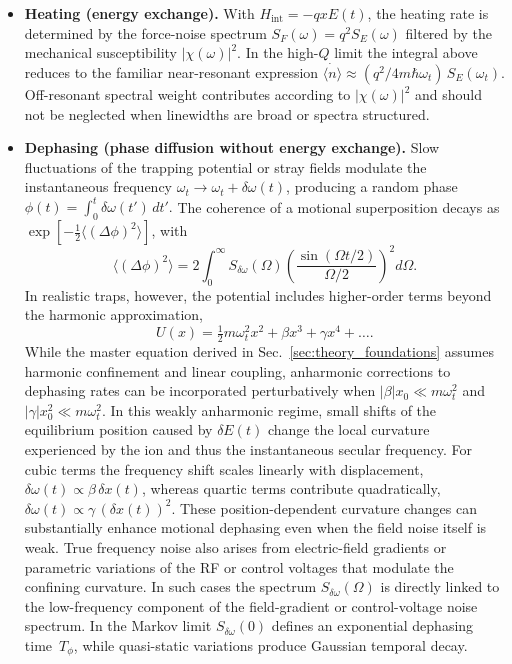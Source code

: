 \begin{itemize}
  \item \textbf{Heating (energy exchange).}
  With $H_\mathrm{int}=-q x E(t)$, the heating rate is determined by the
  force-noise spectrum $S_F(\omega)=q^2 S_E(\omega)$ filtered by the
  mechanical susceptibility $|\chi(\omega)|^{2}$.  In the high-$Q$ limit the
  integral above reduces to the familiar near-resonant expression
  $\dot{\langle n\rangle}\!\approx\! (q^{2}/4m\hbar\omega_t)\,S_E(\omega_t)$.
  Off-resonant spectral weight contributes according to
  $|\chi(\omega)|^{2}$ and should not be neglected when linewidths are broad
  or spectra structured.

  \item \textbf{Dephasing (phase diffusion without energy exchange).}
  Slow fluctuations of the trapping potential or stray fields modulate the
  instantaneous frequency
  $\omega_t\!\rightarrow\!\omega_t+\delta\omega(t)$,
  producing a random phase
  $\phi(t)=\int_{0}^{t}\delta\omega(t')\,dt'.$
  The coherence of a motional superposition decays as
  $\exp[-\tfrac{1}{2}\langle(\Delta\phi)^{2}\rangle]$, with
  \[
    \langle(\Delta\phi)^{2}\rangle
      = 2\!\int_{0}^{\infty}\! S_{\delta\omega}(\Omega)
        \!\left(\frac{\sin(\Omega t/2)}{\Omega/2}\right)^{2}\! d\Omega .
  \]
  In realistic traps, however, the potential includes higher-order terms
  beyond the harmonic approximation,
  \[
    U(x) = \tfrac{1}{2}m\omega_t^2x^2 + \beta x^3 + \gamma x^4 + \dots .
  \]
  While the master equation derived in Sec.~\ref{sec:theory_foundations}
  assumes harmonic confinement and linear coupling, anharmonic corrections
  to dephasing rates can be incorporated perturbatively when
  $|\beta|x_0 \ll m\omega_t^2$ and $|\gamma|x_0^2 \ll m\omega_t^2$.
  In this weakly anharmonic regime, small shifts of the equilibrium position
  caused by $\delta E(t)$ change the local curvature experienced by the ion
  and thus the instantaneous secular frequency.
  For cubic terms the frequency shift scales linearly with displacement,
  $\delta\omega(t) \propto \beta\,\delta x(t)$,
  whereas quartic terms contribute quadratically,
  $\delta\omega(t) \propto \gamma\,(\delta x(t))^{2}$.
  These position-dependent curvature changes can substantially enhance
  motional dephasing even when the field noise itself is weak.
  True frequency noise also arises from electric-field gradients or
  parametric variations of the RF or control voltages that modulate the
  confining curvature.  In such cases the spectrum
  $S_{\delta\omega}(\Omega)$ is directly linked to the low-frequency
  component of the field-gradient or control-voltage noise spectrum.
  In the Markov limit $S_{\delta\omega}(0)$ defines an exponential
  dephasing time~$T_{\phi}$, while quasi-static variations produce Gaussian
  temporal decay.
\end{itemize}

